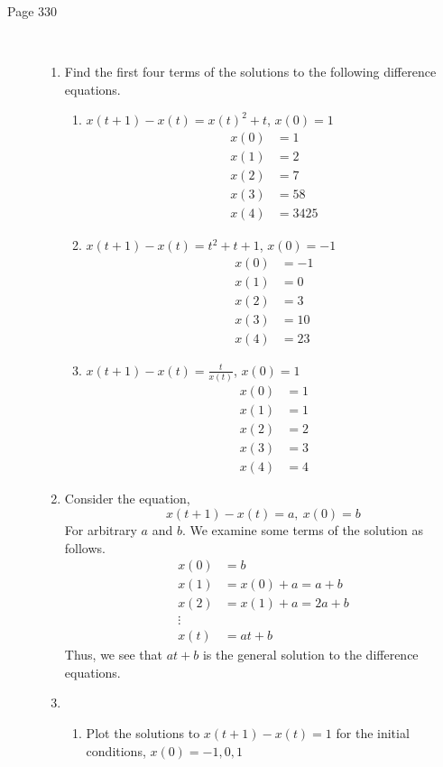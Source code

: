 \documentclass[letterpaper,10pt]{article}
\begin{document}
\begin{description}
\item[Page 330]\hfill\\
\begin{enumerate}
\item Find the first four terms of the solutions to the following difference equations.
\begin{enumerate}
\item $x(t+1)-x(t)=x(t)^2+t$, $x(0)=1$
\begin{align*}
x(0)&=1\\
x(1)&=2\\
x(2)&=7\\
x(3)&=58\\
x(4)&=3425
\end{align*}
\item $x(t+1)-x(t)=t^2+t+1$, $x(0)=-1$
\begin{align*}
x(0)&=-1\\
x(1)&=0\\
x(2)&=3\\
x(3)&=10\\
x(4)&=23
\end{align*}
\item $x(t+1)-x(t)=\frac{t}{x(t)}$, $x(0)=1$
\begin{align*}
x(0)&=1\\
x(1)&=1\\
x(2)&=2\\
x(3)&=3\\
x(4)&=4
\end{align*}
\end{enumerate}
\item Consider the equation,
\[x(t+1)-x(t)=a,\ x(0)=b\]
For arbitrary $a$ and $b$. We examine some terms of the solution as follows.
\begin{align*}
x(0)&=b\\
x(1)&=x(0)+a=a+b\\
x(2)&=x(1)+a=2a+b\\
\vdots\\
x(t)&=at+b
\end{align*}
Thus, we see that $at+b$ is the general solution to the difference equations.
\item \hfill \\
\begin{enumerate}
\item Plot the solutions to $x(t+1)-x(t)=1$ for the initial conditions, $x(0)=-1,0,1$
\begin{center}

\end{center}
\end{enumerate}
\end{enumerate}
\end{description}
\end{document}
